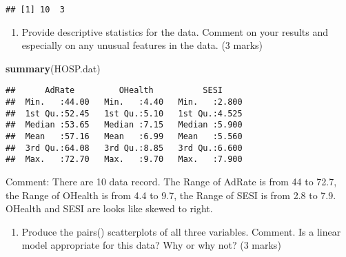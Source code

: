 \documentclass[11pt,]{article}
\newenvironment{Shaded}{\begin{snugshade}}{\end{snugshade}}
\newcommand{\KeywordTok}[1]{\textcolor[rgb]{0.13,0.29,0.53}{\textbf{#1}}}
\newcommand{\DataTypeTok}[1]{\textcolor[rgb]{0.13,0.29,0.53}{#1}}
\newcommand{\DecValTok}[1]{\textcolor[rgb]{0.00,0.00,0.81}{#1}}
\newcommand{\StringTok}[1]{\textcolor[rgb]{0.31,0.60,0.02}{#1}}
\newcommand{\CommentTok}[1]{\textcolor[rgb]{0.56,0.35,0.01}{\textit{#1}}}
\newcommand{\OperatorTok}[1]{\textcolor[rgb]{0.81,0.36,0.00}{\textbf{#1}}}
\newcommand{\NormalTok}[1]{#1}
\providecommand{\tightlist}{%
  \setlength{\itemsep}{0pt}\setlength{\parskip}{0pt}}
\begin{document}
\begin{Shaded}
\end{Shaded}

\begin{verbatim}
## [1] 10  3
\end{verbatim}

\begin{enumerate}
\def\labelenumi{\arabic{enumi}.}
\tightlist
\item
  Provide descriptive statistics for the data. Comment on your results
  and especially on any unusual features in the data. (3 marks)
\end{enumerate}

\begin{Shaded}
\begin{Highlighting}[]
\KeywordTok{summary}\NormalTok{(HOSP.dat)}
\end{Highlighting}
\end{Shaded}

\begin{verbatim}
##      AdRate         OHealth          SESI      
##  Min.   :44.00   Min.   :4.40   Min.   :2.800  
##  1st Qu.:52.45   1st Qu.:5.10   1st Qu.:4.525  
##  Median :53.65   Median :7.15   Median :5.900  
##  Mean   :57.16   Mean   :6.99   Mean   :5.560  
##  3rd Qu.:64.08   3rd Qu.:8.85   3rd Qu.:6.600  
##  Max.   :72.70   Max.   :9.70   Max.   :7.900
\end{verbatim}

Comment: There are 10 data record. The Range of AdRate is from 44 to
72.7, the Range of OHealth is from 4.4 to 9.7, the Range of SESI is from
2.8 to 7.9. OHealth and SESI are looks like skewed to right.

\begin{enumerate}
\def\labelenumi{\arabic{enumi}.}
\setcounter{enumi}{1}
\tightlist
\item
  Produce the pairs() scatterplots of all three variables. Comment. Is a
  linear model appropriate for this data? Why or why not? (3 marks)
\end{enumerate}
\end{document}
